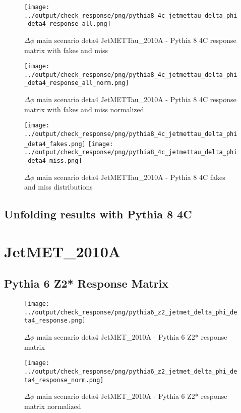 \documentclass[11pt]{book}
\begin{document}
\begin{figure}[ht]
\centering
\texttt{[image: ../output/check\_response/png/pythia8\_4c\_jetmettau\_delta\_phi\_deta4\_response\_all.png]}
\caption{$\Delta\phi$ main scenario deta4 JetMETTau\_2010A - Pythia 8 4C response matrix with fakes and miss}
\label{p8_jetmettau_delta_phi_deta4_response_all}
\end{figure}

\begin{figure}[ht]
\centering
\texttt{[image: ../output/check\_response/png/pythia8\_4c\_jetmettau\_delta\_phi\_deta4\_response\_all\_norm.png]}
\caption{$\Delta\phi$ main scenario deta4 JetMETTau\_2010A - Pythia 8 4C response matrix with fakes and miss normalized}
\label{p8_jetmettau_delta_phi_deta4_response_all_norm}
\end{figure}

\begin{figure}[ht]
\centering
\texttt{[image: ../output/check\_response/png/pythia8\_4c\_jetmettau\_delta\_phi\_deta4\_fakes.png]}
\texttt{[image: ../output/check\_response/png/pythia8\_4c\_jetmettau\_delta\_phi\_deta4\_miss.png]}
\caption{$\Delta\phi$ main scenario deta4 JetMETTau\_2010A - Pythia 8 4C fakes and miss distributions}
\label{p8_jetmettau_delta_phi_deta4_fakesmiss}
\end{figure}


\clearpage
\subsection{Unfolding results with Pythia 8 4C}


\section{JetMET\_2010A}
\subsection{Pythia 6 Z2* Response Matrix}

\begin{figure}[ht]
\centering
\texttt{[image: ../output/check\_response/png/pythia6\_z2\_jetmet\_delta\_phi\_deta4\_response.png]}
\caption{$\Delta\phi$ main scenario deta4 JetMET\_2010A - Pythia 6 Z2* response matrix}
\label{p6_jetmet_delta_phi_deta4_response}
\end{figure}

\begin{figure}[ht]
\centering
\texttt{[image: ../output/check\_response/png/pythia6\_z2\_jetmet\_delta\_phi\_deta4\_response\_norm.png]}
\caption{$\Delta\phi$ main scenario deta4 JetMET\_2010A - Pythia 6 Z2* response matrix normalized}
\label{p6_jetmet_delta_phi_deta4_response_norm}
\end{figure}
\end{document}
